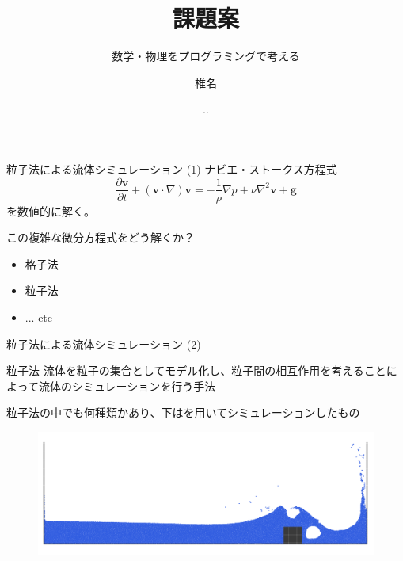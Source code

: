

\title{課題案}
\subtitle{数学・物理をプログラミングで考える}
\author{椎名}
\date{\the\year.\the\month.\the\day}



\begin{frame}
  \titlepage
\end{frame}

\begin{frame}{粒子法による流体シミュレーション (1)}
  ナビエ・ストークス方程式
  \[
    \frac{\partial \bm{v}}{\partial t} + (\bm{v} \cdot \nabla)\bm{v} = - \frac{1}{\rho}\nabla p + \nu \nabla^2\bm{v} + \bm{g}
  \]
  を数値的に解く。

  \bigskip
  この複雑な微分方程式をどう解くか？
  \begin{itemize}
    \item 格子法
    \item 粒子法
    \item ... etc
  \end{itemize}
\end{frame}

\begin{frame}{粒子法による流体シミュレーション (2)}
  \begin{block}{粒子法}
    流体を粒子の集合としてモデル化し、粒子間の相互作用を考えることによって流体のシミュレーションを行う手法
  \end{block}
  粒子法の中でも何種類かあり、下はを用いてシミュレーションしたもの
  \begin{figure}
    \includegraphics[width=0.6\hsize]{images/dambreaking.png}
  \end{figure}
\end{frame}


